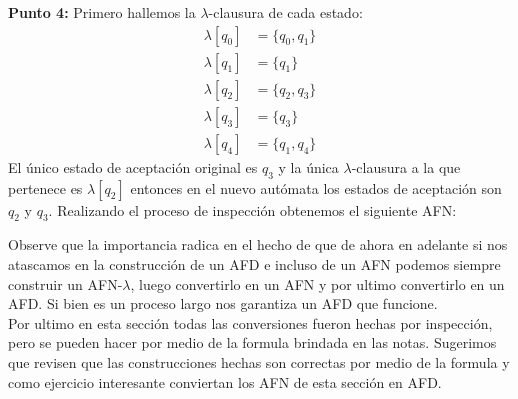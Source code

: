 \textbf{Punto 4: }Primero hallemos la $\lambda$-clausura de cada estado:
\begin{align*}
    \lambda[q_0]&=\{q_0,q_1\}\\
    \lambda[q_1]&=\{q_1\}\\
    \lambda[q_2]&=\{q_2,q_3\}\\
    \lambda[q_3]&=\{q_3\}\\ 
    \lambda[q_4]&=\{q_1,q_4\}
\end{align*}
El único estado de aceptación original es $q_3$ y la única $\lambda$-clausura a la que pertenece es $\lambda[q_2]$ entonces en el nuevo autómata los estados de aceptación son $q_2$ y $q_3$. Realizando el proceso de inspección obtenemos el siguiente AFN:
\begin{basedtikz}
\end{basedtikz}
Observe que la importancia radica en el hecho de que de ahora en adelante si nos atascamos en la construcción de un AFD e incluso de un AFN podemos siempre construir un AFN-$\lambda$, luego convertirlo en un AFN y por ultimo convertirlo en un AFD. Si bien es un proceso largo nos garantiza un AFD que funcione.\\
Por ultimo en esta sección todas las conversiones fueron hechas por inspección, pero se pueden hacer por medio de la formula brindada en las notas. Sugerimos que revisen que las construcciones hechas son correctas por medio de la formula y como ejercicio interesante conviertan los AFN de esta sección en AFD.

